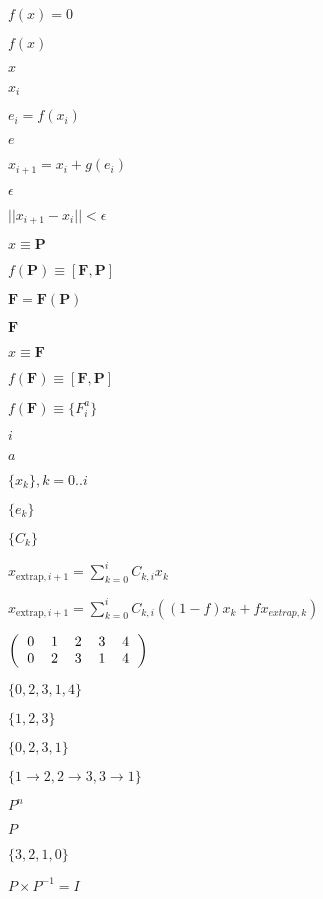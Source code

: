 \documentclass{article}
\begin{document}
$ f(x) = 0 $
\pagebreak

$ f(x) $
\pagebreak

$ x $
\pagebreak

$ x_i $
\pagebreak

$ e_i = f(x_i) $
\pagebreak

$ e $
\pagebreak

$ x_{i+1} = x_i + g(e_i) $
\pagebreak

$ \epsilon $
\pagebreak

$ ||x_{i+1} - x_i|| < \epsilon $
\pagebreak

$ x \equiv \mathbf{P} $
\pagebreak

$ f(\mathbf{P}) \equiv [\mathbf{F}, \mathbf{P}] $
\pagebreak

$ \mathbf{F} = \mathbf{F}(\mathbf{P}) $
\pagebreak

$ \mathbf{F} $
\pagebreak

$ x \equiv \mathbf{F} $
\pagebreak

$ f(\mathbf{F}) \equiv [\mathbf{F}, \mathbf{P}] $
\pagebreak

$ f(\mathbf{F}) \equiv \{ F_i^a \} $
\pagebreak

$ i $
\pagebreak

$ a $
\pagebreak

$ \{ x_k \}, k=0..i $
\pagebreak

$ \{ e_k \} $
\pagebreak

$ \{ C_k \} $
\pagebreak

$ x_{\mathrm{extrap},i+1} = \sum\limits_{k=0}^i C_{k,i} x_{k} $
\pagebreak

$ x_{\mathrm{extrap},i+1} = \sum\limits_{k=0}^i C_{k,i} ( (1-f) x_{k} + f x_{extrap,k} ) $
\pagebreak

$ \left( \begin{tabular}{ccccc} 0 & 1 & 2 & 3 & 4 \\ 0 & 2 & 3 & 1 & 4 \end{tabular} \right) $
\pagebreak

$ \{0, 2, 3, 1, 4\} $
\pagebreak

$ \{1, 2, 3\} $
\pagebreak

$ \{0, 2, 3, 1\} $
\pagebreak

$ \{ 1 \to 2, 2 \to 3, 3 \to 1 \} $
\pagebreak

$ P^n $
\pagebreak

$ P $
\pagebreak

$ \{3, 2, 1, 0 \} $
\pagebreak

$ P \times P^{-1} = I $
\pagebreak
\end{document}
